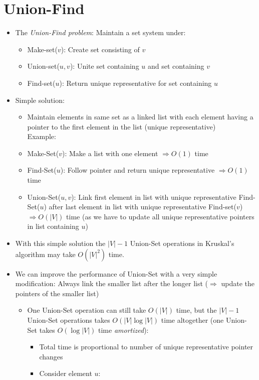 \documentclass[11pt]{article}
\begin{document}
\section{Union-Find}
\begin{itemize}
\item The \emph{Union-Find problem}: Maintain a set system under:
  \begin{itemize}
  \item {\sc Make-set}($v$): Create set consisting of $v$
  \item {\sc Union-set}($u,v$): Unite set containing $u$ and set
    containing $v$
  \item {\sc Find-set}($u$): Return unique representative for
    set containing $u$
  \end{itemize}
  
\item Simple solution:
  \begin{itemize}
  \item Maintain elements in same set as a linked list with each
    element having a pointer to the first element in the list (unique
    representative) \\
    

Example: \\

\centerline{}

\item {\sc Make-Set}($v$): Make a list with one element
  $\Rightarrow O(1)$ time
\item {\sc Find-Set}($u$): Follow pointer and return unique
  representative $\Rightarrow O(1)$ time
\item {\sc Union-Set}($u,v$): Link first element in list with
  unique representative {\sc Find-Set}($u$) after last element
  in list with unique representative {\sc Find-set}($v$) $\Rightarrow
  O(|V|)$ time (as we have to update all unique representative
  pointers in list containing $u$)
  \end{itemize}
\item With this simple solution the $\vert V \vert -1$ {\sc Union-Set}
  operations in Kruskal's algorithm may take $O(\vert V \vert ^2)$ time.
\item We can improve the performance of {\sc Union-Set} with a very simple
  modification: Always link the smaller list after the longer list
  ($\Rightarrow$ update the pointers of the smaller list)
  \begin{itemize}
  \item One {\sc Union-Set} operation can still take $O(\vert V
    \vert)$ time, but the $\vert V \vert -1$ {\sc Union-Set} operations
    takes $O(\vert V \vert \log \vert V \vert)$ time altogether (one
    {\sc Union-Set} takes $O(\log \vert V \vert)$ time
    \emph{amortized}):
    \begin{itemize}
    \item Total time is proportional to number of unique
      representative pointer changes
    \item Consider element $u$:
      

\end{itemize}
\end{itemize}
\end{itemize}
\end{document}
